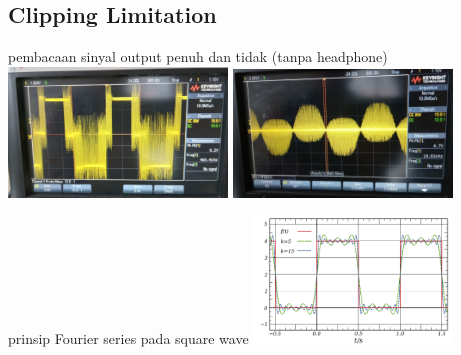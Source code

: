 \documentclass[table,dvipsnames]{beamer}
\begin{document}
	\begin{frame}
		\subsection{Clipping Limitation}
		\begin{exampleblock}{pembacaan sinyal output penuh dan tidak (tanpa headphone)}
			\includegraphics[width=165pt]{images/sinefull_osc}
			\includegraphics[width=165pt]{images/sine_osc}
		\end{exampleblock}
		
		\begin{exampleblock}{prinsip Fourier series pada square wave}
			\centering
			\includegraphics[width=150pt]{images/square_wave_fourier}
		\end{exampleblock}
	\end{frame}
	
\end{document}
